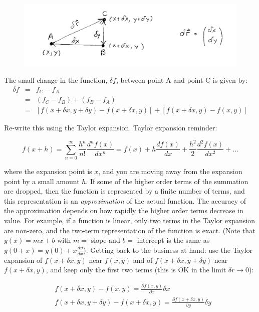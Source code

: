 \documentclass[12pt]{article}
\begin{document}
\begin{flushleft}
\begin{figure}[h]
\centering
\includegraphics*[trim=1cm 0cm 1cm 0cm, clip=true, width=0.8\columnwidth]{grad.png}
\caption{}
\label{fig:grad}
\end{figure}

The small change in the function, $\delta f$, between point A and point C is given by:
\begin{eqnarray}
\delta f & =  & f_{C}-f_{A} \nonumber \\ 
            & =  &  (f_{C}-f_{B}) + (f_{B}-f_{A}) \nonumber \\
            & = &  [f(x+\delta x, y+\delta y) - f(x+\delta x, y)] + [f(x+\delta x, y)-f(x, y)] \label{eq:df}
\end{eqnarray}

Re-write this using the Taylor expansion.  Taylor expansion reminder:

\[
f(x+h)=\sum_{n=0}^{\infty} \frac{h^{n}}{n!}\frac{d^{n}f(x)}{dx^{n}}=f(x)+h\frac{df(x)}{dx}+\frac{h^{2}}{2}\frac{d^{2}f(x)}{dx^{2}}+\dots
\]

where the expansion point is $x$, and you are moving away from the expansion point by a small amount $h$.  If some of the higher order terms of the summation are dropped, then the function is represented by a finite number of terms, and this representation is an {\it approximation} of the actual function.  The accuracy of the approximation depends on how rapidly the higher order terms decrease in value.  For example, if a function is linear, only two terms in the Taylor expansion are non-zero, and the two-term representation of the function is exact.  (Note that $y(x)=mx+b$ with $m=$ slope and $b=$ intercept is the same as  $y(0+x)=y(0)+ x\frac{dy}{dx}$).  Getting back to the business at hand: use the Taylor expansion of $f(x+\delta x,y)$ near $f(x,y)$ and of $ f(x+\delta x,y+\delta y)$ near $f(x+\delta x,y)$, and keep only the first two terms (this is OK in the limit $\delta r \rightarrow 0$):

\begin{equation*}
\begin{aligned}
& f(x+\delta x,y) - f(x,y) = \frac{\partial f(x,y)}{\partial x} \delta x \\
& f(x+\delta x,y+\delta y) - f(x+\delta x,y) = \frac{\partial f(x+\delta x,y)}{\partial y} \delta y
\end{aligned}
\end{equation*}


\end{flushleft}
\end{document}
